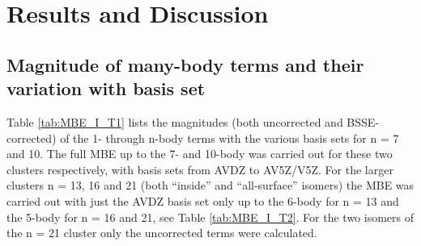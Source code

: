 \documentclass[11pt, proquest]{uwthesis}[2020/02/24]
\begin{document}
\section{Results and Discussion}\label{sec:3_results}
\subsection{Magnitude of many-body terms and their variation with basis set}



\par Table \ref{tab:MBE_I_T1} lists the magnitudes (both uncorrected and BSSE-corrected) of the 1- through n-body terms with the various basis sets for n = 7 and 10. The full MBE up to the 7- and 10-body was carried out for these two clusters respectively, with basis sets from AVDZ to AV5Z/V5Z. For the larger clusters n = 13, 16 and 21 (both “inside” and “all-surface” isomers) the MBE was carried out with just the AVDZ basis set only up to the 6-body for n = 13 and the 5-body for n = 16 and 21, see Table \ref{tab:MBE_I_T2}. For the two isomers of the n = 21 cluster only the uncorrected terms were calculated.


\end{document}
